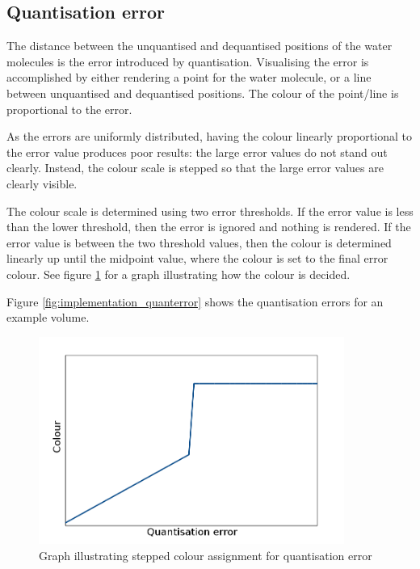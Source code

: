 
\subsection{Quantisation error}
\label{sub:implementation_quantisation}

The distance between the unquantised and dequantised positions of the water
molecules is the error introduced by quantisation. Visualising the error is
accomplished by either rendering a point for the water molecule, or a line
between unquantised and dequantised positions. The colour of the point/line is
proportional to the error.

As the errors are uniformly distributed, having the colour linearly
proportional to the error value produces poor results: the large error values
do not stand out clearly. Instead, the colour scale is stepped so that the
large error values are clearly visible.

The colour scale is determined using two error thresholds. If the error value
is less than the lower threshold, then the error is ignored and nothing is
rendered. If the error value is between the two threshold values, then the
colour is determined linearly up until the midpoint value, where the colour is
set to the final error colour. See figure \ref{fig:implementation_quantgraph}
for a graph illustrating how the colour is decided.

Figure \ref{fig:implementation_quanterror} shows the quantisation errors for an
example volume.

\begin{figure}[h!]
  \begin{center}
    \includegraphics[width=100mm]{quant_colour_graph}
  \end{center}
  \caption{Graph illustrating stepped colour assignment for quantisation error}
  \label{fig:implementation_quantgraph}
\end{figure}

